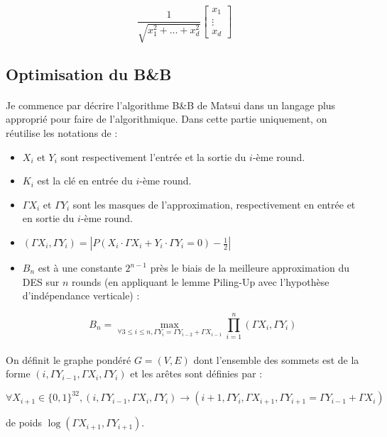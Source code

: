 \documentclass{scrartcl}
\begin{document}
$$\frac{1}{\sqrt{x_1^2+\ldots+x_d^2}}\begin{bmatrix}x_1\\\vdots\\x_d\end{bmatrix}$$


\subsection{Optimisation du B\&B}

\paragraph*{}
Je commence par décrire l'algorithme B\&B de Matsui dans un langage plus approprié pour faire de l'algorithmique. Dans cette
partie uniquement, on réutilise les notations de \cite{Matsui1995} :

\begin{itemize}
	\item $X_i$ et $Y_i$ sont respectivement l'entrée et la sortie du $i$-ème round.
	\item $K_i$ est la clé en entrée du $i$-ème round.
	\item $\Gamma X_i$ et $\Gamma Y_i$ sont les masques de l'approximation, respectivement en entrée et en sortie
	du $i$-ème round.
	\item $(\Gamma X_i, \Gamma Y_i)=\left|P(X_i\cdot \Gamma X_i + Y_i\cdot \Gamma Y_i=0)-\frac{1}{2}\right|$
	\item $B_n$ est à une constante $2^{n-1}$ près le biais de la meilleure approximation du DES sur $n$ rounds (en appliquant
	le lemme Piling-Up avec l'hypothèse d'indépendance verticale) :

		$$B_n=\underset{\forall 3\le i\le n, \Gamma Y_i=\Gamma Y_{i-2}+\Gamma X_{i-1}}{\max}\prod_{i=1}^n (\Gamma X_i, \Gamma Y_i)$$
\end{itemize}

\paragraph*{}
On définit le graphe pondéré $G = (V,E)$ dont l'ensemble des sommets est de la forme $(i,\Gamma Y_{i-1},\Gamma X_i,\Gamma Y_i)$ et les
arêtes sont définies par :

$$\forall X_{i+1}\in \{0,1\}^{32},(i, \Gamma Y_{i-1},\Gamma X_i,\Gamma Y_i)\longrightarrow (i+1,\Gamma Y_i,\Gamma X_{i+1},\Gamma Y_{i+1}=\Gamma Y_{i-1}+\Gamma X_i)$$

de poids $\log (\Gamma X_{i+1},\Gamma Y_{i+1})$.
\end{document}
